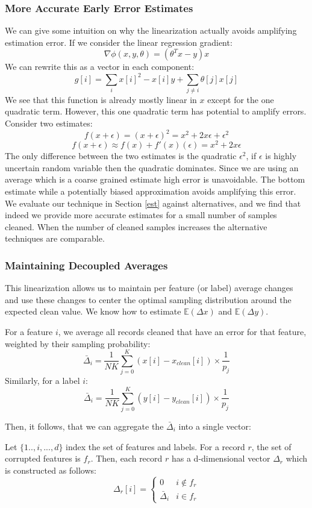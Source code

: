 \subsubsection{More Accurate Early Error Estimates}
We can give some intuition on why the linearization actually avoids amplifying estimation error.
If we consider the linear regression gradient:
\[
\nabla\phi(x,y,\theta) = (\theta^Tx - y)x
\]
We can rewrite this as a vector in each component:
\[
g[i] = \sum_{i} x[i]^2-x[i]y + \sum_{j \ne i} \theta[j]x[j]
\]
We see that this function is already mostly linear in $x$ except for the one quadratic term.
However, this one quadratic term has potential to amplify errors.
Consider two estimates:
\[
f(x+\epsilon) = (x+\epsilon)^2 = x^2 + 2x\epsilon + \epsilon^2
\]
\[
f(x+\epsilon) \approx f(x) + f'(x)(\epsilon) = x^2 + 2x\epsilon
\]
The only difference between the two estimates is the quadratic $\epsilon^2$, if $\epsilon$ is highly uncertain random variable then the quadratic dominates.
Since we are using an average which is a coarse grained estimate high error is unavoidable.
The bottom estimate while a potentially biased approximation avoids amplifying this error.
We evaluate our technique in Section \ref{est} against alternatives, and we find that indeed we provide more accurate estimates for a small number of samples cleaned.
When the number of cleaned samples increases the alternative techniques are comparable.

\subsubsection{Maintaining Decoupled Averages}
This linearization allows us to maintain per feature (or label) average changes and use these changes to center the optimal sampling distribution around the expected clean value.
We know how to estimate $\mathbb{E}(\Delta x)$ and $\mathbb{E}(\Delta y)$.
\begin{lemma}
For a feature $i$, we average all records cleaned that have an error for that feature, weighted by their sampling probability:
\[
\bar{\Delta}_i = \frac{1}{NK}\sum_{j=0}^K (x[i]-x_{clean}[i])\times \frac{1}{p_j}
\]
Similarly, for a label $i$:
\[
\bar{\Delta}_i = \frac{1}{NK}\sum_{j=0}^K (y[i]-y_{clean}[i])\times \frac{1}{p_j}
\]
\end{lemma}

Then, it follows, that we can aggregate the $\bar{\Delta}_i$ into a single vector:
\begin{lemma}
Let $\{1..,i,...,d\}$ index the set of features and labels.
For a record $r$, the set of corrupted features is $f_r$.
Then, each record $r$ has a d-dimensional vector $\Delta_r$ which is constructed as follows:
\[
 \Delta_r[i] = \begin{cases} 0 & i \notin f_r \\ 
\bar{\Delta}_i & i \in f_r
\end{cases} 
\]
\end{lemma}

